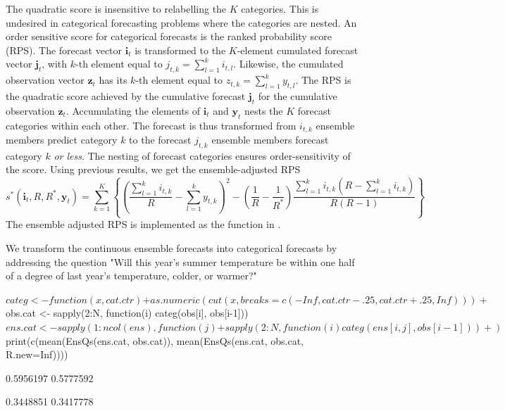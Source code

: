 \documentclass[article]{jss}
\begin{document}
The quadratic score is insensitive to relabelling the $K$ categories.
This is undesired in categorical forecasting problems where the categories are nested.
An order sensitive score for categorical forecasts is the ranked probability score (RPS).
The forecast vector $\mathbf{i}_t$ is transformed to the $K$-element cumulated forecast vector $\mathbf{j}_t$, with $k$-th element equal to $j_{t,k} = \sum_{l=1}^k i_{t,l}$.
Likewise, the cumulated observation vector $\mathbf{z}_t$ has its $k$-th element equal to $z_{t,k} = \sum_{l=1}^k y_{t,l}$.
The RPS is the quadratic score achieved by the cumulative forecast $\mathbf{j}_t$ for the cumulative observation $\mathbf{z}_t$.
Accumulating the elements of $\mathbf{i}_t$ and $\mathbf{y}_t$ nests the $K$ forecast categories within each other. 
The forecast is thus transformed from $i_{t,k}$ ensemble members predict category $k$ to the forecast $j_{t,k}$ ensemble members forecast category $k$ \emph{or less}.
The nesting of forecast categories ensures order-sensitivity of the score.
Using previous results, we get the ensemble-adjusted RPS
%
\begin{equation}
s^*(\mathbf{i}_t, R, R^*, \mathbf{y}_t) = \sum_{k=1}^K \left\{ \left(\frac{\sum_{l=1}^k i_{t,k}}{R} - \sum_{l=1}^k y_{t,k}\right)^2 - \left(\frac{1}{R} - \frac{1}{R^*}\right) \frac{\sum_{l=1}^k i_{t,k}(R-\sum_{l=1}^k i_{t,k})}{R(R-1)}\right\}
\end{equation}
%
The ensemble adjusted RPS is implemented as the function  in .



We transform the continuous ensemble forecasts into categorical forecasts by addressing the question "Will this year's summer temperature be within one half of a degree of last year's temperature, colder, or warmer?"

\begin{Schunk}
\begin{Sinput}
$ categ <- function(x, cat.ctr) {
+   as.numeric(cut(x, breaks=c(-Inf, cat.ctr-.25, cat.ctr+.25, Inf)))
+ }
$ obs.cat <- sapply(2:N, function(i) categ(obs[i], obs[i-1]))
$ ens.cat <- sapply(1:ncol(ens), function(j) {
+                   sapply(2:N, function(i) categ(ens[i, j], obs[i-1]))
+            })
$ print(c(mean(EnsQs(ens.cat, obs.cat)), mean(EnsQs(ens.cat, obs.cat, R.new=Inf))))
\end{Sinput}
\begin{Soutput}
[1] 0.5956197 0.5777592
\end{Soutput}
\begin{Soutput}
[1] 0.3448851 0.3417778
\end{Soutput}
\end{Schunk}
\end{document}
